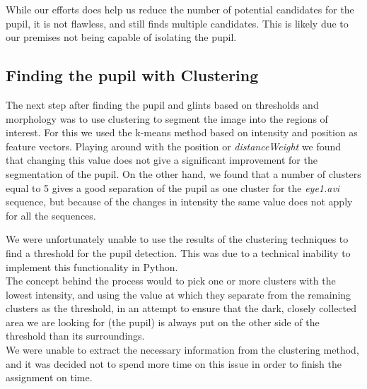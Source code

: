 While our efforts does help us reduce the number of potential candidates for the pupil, it is not flawless, and still finds multiple candidates. This is likely due to our premises not being capable of isolating the pupil.
\newline

\subsection{Finding the pupil with Clustering}
The next step after finding the pupil and glints based on thresholds and morphology was to use clustering to segment the image into the regions of interest. For this we used the k-means method based on intensity and position as feature vectors. Playing around with the position or \emph{distanceWeight} we found that changing this value does not give a significant improvement for the segmentation of the pupil. On the other hand, we found that a number of clusters equal to 5 gives a good separation of the pupil as one cluster for the \emph{eye1.avi} sequence, but because of the changes in intensity the same value does not apply for all the sequences.\newline

We were unfortunately unable to use the results of the clustering techniques to find a threshold for the pupil detection. This was due to a technical inability to implement this functionality in Python.\\
The concept behind the process would to pick one or more clusters with the lowest intensity, and using the value at which they separate from the remaining clusters as the threshold, in an attempt to ensure that the dark, closely collected area we are looking for (the pupil) is always put on the other side of the threshold than its surroundings.\\
We were unable to extract the necessary information from the clustering method, and it was decided not to spend more time on this issue in order to finish the assignment on time. 